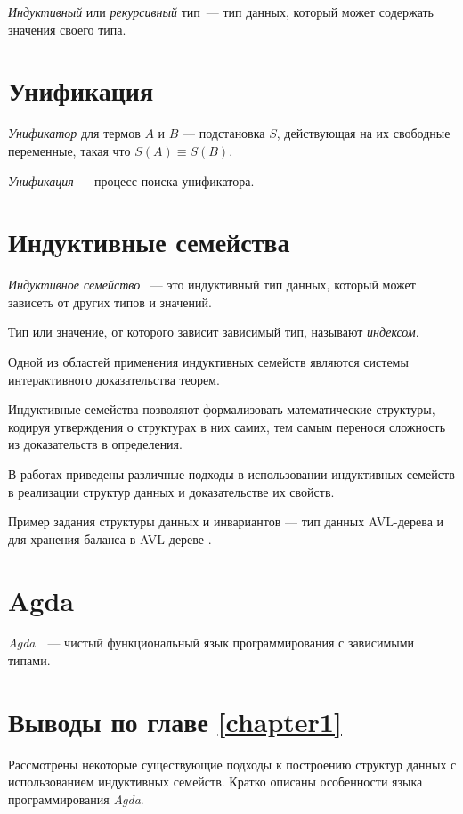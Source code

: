 \emph{Индуктивный} или \emph{рекурсивный} тип~— тип данных, который может
содержать значения своего типа.

\section{Унификация}

\emph{Унификатор} для термов $A$ и $B$ — подстановка $S$, действующая на их
свободные переменные, такая что $S(A) \equiv S(B)$.

\emph{Унификация} — процесс поиска унификатора.

\section{Индуктивные семейства}

\begin{definition}
\emph{Индуктивное семейство} \cite{DybjerIndFam, RefiningIT}~— это индуктивный тип данных,
который может зависеть от других типов и значений.

Тип или значение, от которого зависит зависимый тип, называют \emph{индексом}.
\end{definition}

Одной из областей применения индуктивных семейств являются системы интерактивного
доказательства теорем.

Индуктивные семейства позволяют формализовать математические структуры, кодируя утверждения о структурах в них самих, тем самым перенося сложность из доказательств в определения.

В работах \cite{HongweiXi, McBridePivotal} приведены различные подходы
в использовании индуктивных семейств в реализации структур данных
и доказательстве их свойств.

Пример задания структуры данных и инвариантов —
тип данных AVL-дерева и для хранения баланса в AVL-дереве \cite{AVLTree}.
\newline


\section{Agda}
\emph{Agda}~\cite{AgdaLang}~---  чистый функциональный язык программирования с зависимыми типами.


\section{Выводы по главе \ref{chapter1}}

Рассмотрены некоторые существующие подходы к построению структур данных
с использованием индуктивных семейств.
Кратко описаны особенности языка программирования \textit{Agda}.
